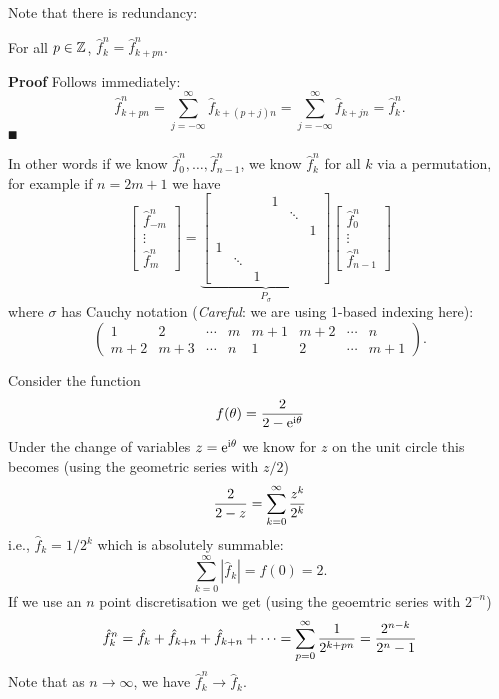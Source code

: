 Note that there is redundancy:

\begin{corollary}[aliasing] For all $p \in {\mathbb Z}$, $\hat f_k^n = \hat f_{k+pn}^n$.

\end{corollary}
\textbf{Proof} Follows immediately:
\[
\hat f_{k+pn}^n = \sum_{j=-\ensuremath{\infty}}^\ensuremath{\infty} \hat f_{k+(p+j)n}= \sum_{j=-\ensuremath{\infty}}^\ensuremath{\infty} \hat f_{k+j n} = \hat f_k^n.
\]
\ensuremath{\QED}

In other words if we know $\hat f_0^n, \ensuremath{\ldots}, \hat f_{n-1}^n$, we know $\hat f_k^n$ for all $k$ via a permutation, for example if $n = 2m+1$ we have
\[
\begin{bmatrix}
\hat f_{-m}^n \\
\ensuremath{\vdots}\\
\hat f_m^n
\end{bmatrix} = \underbrace{\begin{bmatrix} &&& 1 \\ &&&& \ensuremath{\ddots} \\ &&&&& 1 \\
    1 \\ & \ensuremath{\ddots} \\ && 1 \end{bmatrix}}_{P_\ensuremath{\sigma}}
\begin{bmatrix}
\hat f_0^n \\
\ensuremath{\vdots}\\
\hat f_{n-1}^n
\end{bmatrix}
\]
where $\ensuremath{\sigma}$ has Cauchy notation (\emph{Careful}: we are using 1-based indexing here):
\[
\begin{pmatrix}
1 & 2 & \ensuremath{\cdots} & m & m+1 & m+2 & \ensuremath{\cdots} & n  \\
m+2 & m+3 & \ensuremath{\cdots} & n & 1 & 2 & \ensuremath{\cdots} & m+1
\end{pmatrix}.
\]
\begin{example} Consider the function
\[
f(\ensuremath{\theta}) = {2 \over 2 - {\rm e}^{{\rm i} \ensuremath{\theta}}}
\]
Under the change of variables $z = {\rm e}^{{\rm i} \ensuremath{\theta}}$ we know for $z$ on the unit circle this becomes (using the geometric series with $z/2$)
\[
{2 \over 2-z} = \ensuremath{\sum}_{k=0}^\ensuremath{\infty} {z^k \over 2^k}
\]
i.e., $\hat f_k = 1/2^k$ which is absolutely summable:
\[
\ensuremath{\sum}_{k=0}^\ensuremath{\infty} |\hat f_k| = f(0) = 2.
\]
If we use an $n$ point discretisation we get (using the geoemtric series with $2^{-n}$)
\[
\hat f_k^n = \hat f_k + \hat f_{k+n} + \hat f_{k+n} + \ensuremath{\cdots} = \ensuremath{\sum}_{p=0}^\ensuremath{\infty} {1 \over 2^{k+pn}} = {2^{n-k} \over 2^n - 1}
\]
Note that as $n \rightarrow \ensuremath{\infty}$, we have $\hat f_k^n \rightarrow \hat f_k$. \end{example}

